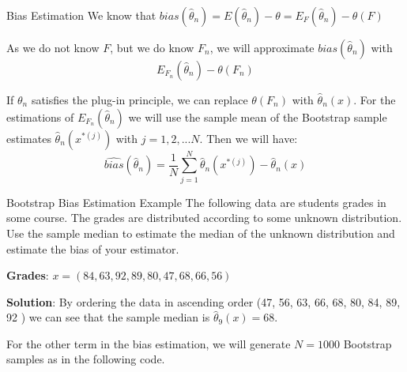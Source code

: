 \documentclass[8pt]{beamer}
\begin{document}
\begin{frame}{Bias Estimation}
We know that $bias\left(\widehat{\theta}_n\right)=E(\widehat{\theta}_n)-\theta=E_F(\widehat{\theta}_n)-\theta(F)$

\vspace{3mm}

As we do not know $F$, but we do know $F_n$, we will approximate $bias\left(\widehat{\theta}_n\right)$ with
\begin{equation*}
E_{F_n}(\widehat{\theta}_n)-\theta(F_n)
\end{equation*}

If $\theta_n$ satisfies the plug-in principle, we can replace $\theta(F_n)$ with $\widehat{\theta}_n(x)$. For the estimations of $E_{F_n}(\widehat{\theta}_n)$ we will use the sample mean of the Bootstrap sample estimates $\widehat{\theta}_n(x^{*(j)})$ with $j=1,2,...N$. Then we will have:
\begin{equation*}
\widehat{bias}\left(\widehat{\theta}_n\right) = 
\frac{1}{N} \sum_{j=1}^N \widehat{\theta}_n\left(x^{*(j)}\right) - \widehat{\theta}_n(x)
\end{equation*}
\end{frame}

\begin{frame}{Bootstrap Bias Estimation Example} 
The following data are students grades in some course. The  grades are distributed according to some unknown distribution. Use the sample median to estimate the median of the unknown distribution and estimate the bias of your estimator.

\vspace{3mm}

\textbf{Grades}: $x=(84, 63, 92, 89, 80, 47, 68, 66, 56)$

\vspace{3mm}

\textbf{Solution}:  By ordering the data in ascending order (47, 56, 63, 66, 68, 80, 84, 89, 92 ) we can see that the sample median is $\widehat{\theta}_9(x)=68$.

\vspace{3mm}

For the other term in the bias estimation, we will generate $N=1000$ Bootstrap samples as in the following code.
\end{frame}
\end{document}
